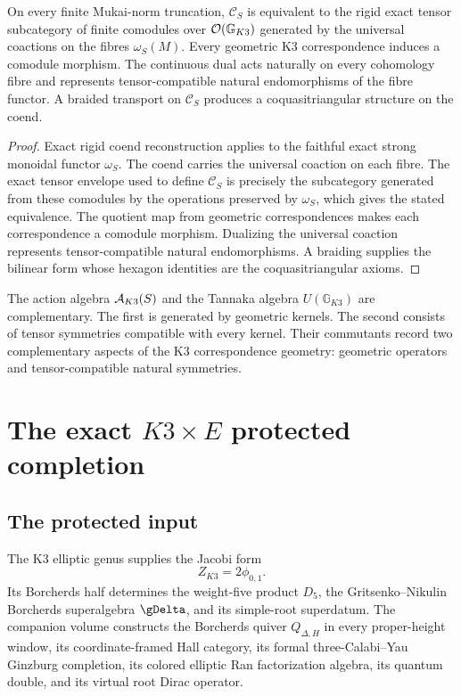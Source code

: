 \begin{theorem}
On every finite Mukai-norm truncation, $\mathscr C_S$ is equivalent to the rigid exact tensor subcategory of finite comodules over $\mathcal O(\mathbb G_{K3})$ generated by the universal coactions on the fibres $\omega_S(M)$.  Every geometric K3 correspondence induces a comodule morphism.  The continuous dual acts naturally on every cohomology fibre and represents tensor-compatible natural endomorphisms of the fibre functor.  A braided transport on $\mathscr C_S$ produces a coquasitriangular structure on the coend.
\end{theorem}
\begin{proof}
Exact rigid coend reconstruction applies to the faithful exact strong monoidal functor $\omega_S$.  The coend carries the universal coaction on each fibre.  The exact tensor envelope used to define $\mathscr C_S$ is precisely the subcategory generated from these comodules by the operations preserved by $\omega_S$, which gives the stated equivalence.  The quotient map from geometric correspondences makes each correspondence a comodule morphism.  Dualizing the universal coaction represents tensor-compatible natural endomorphisms.  A braiding supplies the bilinear form whose hexagon identities are the coquasitriangular axioms.
\end{proof}

The action algebra $\mathcal A_{K3}(S)$ and the Tannaka algebra $U(\mathbb G_{K3})$ are complementary.  The first is generated by geometric kernels.  The second consists of tensor symmetries compatible with every kernel.  Their commutants record two complementary aspects of the K3 correspondence geometry: geometric operators and tensor-compatible natural symmetries.

\part{The exact \texorpdfstring{$K3\times E$}{K3 x E} protected completion}

\chapter{The protected input}
The K3 elliptic genus supplies the Jacobi form
\[
 Z_{K3}=2\phi_{0,1}.
\]
Its Borcherds half determines the weight-five product $D_5$, the Gritsenko--Nikulin Borcherds superalgebra $\gDelta$, and its simple-root superdatum.  The companion volume constructs the Borcherds quiver $Q_{\Delta,H}$ in every proper-height window, its coordinate-framed Hall category, its formal three-Calabi--Yau Ginzburg completion, its colored elliptic Ran factorization algebra, its quantum double, and its virtual root Dirac operator.

